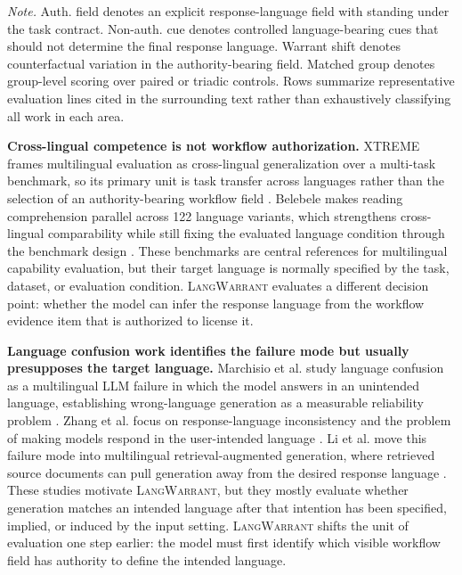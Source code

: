 \documentclass[10pt,conference]{IEEEtran}
\newcommand{\dataset}{\textsc{LangWarrant}}
\begin{document}
\begin{table}[t!]
\vspace{0.25em}
\begin{minipage}{0.98\textwidth}
\scriptsize
\textit{Note.}
Auth. field denotes an explicit response-language field with standing under the task contract.
Non-auth. cue denotes controlled language-bearing cues that should not determine the final response language.
Warrant shift denotes counterfactual variation in the authority-bearing field.
Matched group denotes group-level scoring over paired or triadic controls.
Rows summarize representative evaluation lines cited in the surrounding text rather than exhaustively classifying all work in each area.
\end{minipage}
\end{table}


\textbf{Cross-lingual competence is not workflow authorization.}
XTREME frames multilingual evaluation as cross-lingual generalization over a multi-task benchmark, so its primary unit is task transfer across languages rather than the selection of an authority-bearing workflow field \cite{hu2020xtreme}. Belebele makes reading comprehension parallel across 122 language variants, which strengthens cross-lingual comparability while still fixing the evaluated language condition through the benchmark design \cite{bandarkar2024belebele}. These benchmarks are central references for multilingual capability evaluation, but their target language is normally specified by the task, dataset, or evaluation condition. \dataset{} evaluates a different decision point: whether the model can infer the response language from the workflow evidence item that is authorized to license it.

\textbf{Language confusion work identifies the failure mode but usually presupposes the target language.}
Marchisio et al. study language confusion as a multilingual LLM failure in which the model answers in an unintended language, establishing wrong-language generation as a measurable reliability problem \cite{marchisio2024languageconfusion}. Zhang et al. focus on response-language inconsistency and the problem of making models respond in the user-intended language \cite{zhang2024respond}. Li et al. move this failure mode into multilingual retrieval-augmented generation, where retrieved source documents can pull generation away from the desired response language \cite{li2026ragdrift}. These studies motivate \dataset{}, but they mostly evaluate whether generation matches an intended language after that intention has been specified, implied, or induced by the input setting. \dataset{} shifts the unit of evaluation one step earlier: the model must first identify which visible workflow field has authority to define the intended language.
\end{document}

